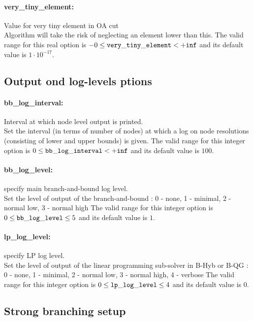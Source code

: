 \paragraph{very\_tiny\_element:} Value for very tiny element in OA cut $\;$ \\
 Algorithm will take the risk of neglecting an
element lower than this. The valid range for this real option is 
$-0 \le {\tt very\_tiny\_element } <  {\tt +inf}$
and its default value is $1 \cdot 10^{-17}$.


\subsection{Output ond log-levels ptions}
\label{sec:Output_ond_log-levels_ptions}
\paragraph{bb\_log\_interval:} Interval at which node level output is printed. $\;$ \\
 Set the interval (in terms of number of nodes) at
which a log on node resolutions (consisting of
lower and upper bounds) is given. The valid range for this integer option is
$0 \le {\tt bb\_log\_interval } <  {\tt +inf}$
and its default value is $100$.


\paragraph{bb\_log\_level:} specify main branch-and-bound log level. $\;$ \\
 Set the level of output of the branch-and-bound :
0 - none, 1 - minimal, 2 - normal low, 3 - normal
high The valid range for this integer option is
$0 \le {\tt bb\_log\_level } \le 5$
and its default value is $1$.


\paragraph{lp\_log\_level:} specify LP log level. $\;$ \\
 Set the level of output of the linear programming
sub-solver in B-Hyb or B-QG : 0 - none, 1 -
minimal, 2 - normal low, 3 - normal high, 4 -
verbose The valid range for this integer option is
$0 \le {\tt lp\_log\_level } \le 4$
and its default value is $0$.


\subsection{Strong branching setup}
\label{sec:Strong_branching_setup}
